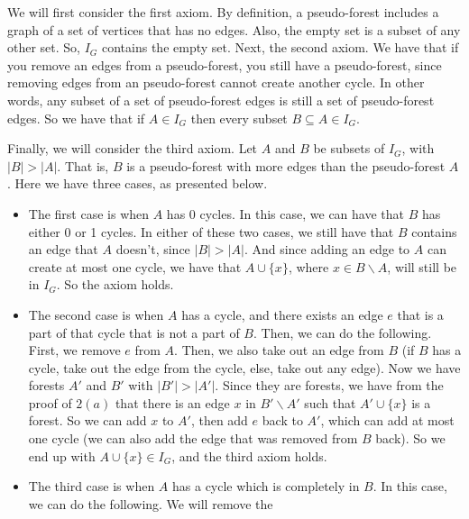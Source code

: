 \documentclass{article}
\begin{document}
\begin{description}
        We will first consider the first axiom. By definition, a pseudo-forest includes
        a graph of a set of vertices that has no edges. Also, the empty set is a
        subset of any other set. So, $I_G$ contains the empty set. Next, the
        second axiom. We have that if you remove an edges from a pseudo-forest,
        you still have a pseudo-forest, since removing edges from an
        pseudo-forest cannot create another cycle. In other words, any subset of
        a set of pseudo-forest edges is still a set of pseudo-forest edges. So
        we have that if $A \in I_G$ then every subset $B \subseteq A \in I_G$.

        Finally, we will consider the third axiom. Let $A$ and $B$ be subsets
        of $I_G$, with $|B| > |A|$. That is, $B$ is a pseudo-forest with more
        edges than the pseudo-forest $A$. Here we have three cases, as
        presented below.
        \begin{itemize}
            \item The first case is when $A$ has 0 cycles. In this case, we can
                have that $B$ has either 0 or 1 cycles. In either of these two
                cases, we still have that $B$ contains an edge that $A$ doesn't,
                since $|B| > |A|$. And since adding an edge to $A$ can create at
                most one cycle, we have that $A \cup \{x\}$, where $x \in B
                \backslash A$, will still be in $I_G$. So the axiom holds.
            \item The second case is when $A$ has a cycle, and there exists an
                edge $e$ that is a part of that cycle that is not a part of $B$.
                Then, we can do the following. First, we remove $e$ from $A$.
                Then, we also take out an edge from $B$ (if $B$ has a cycle,
                take out the edge from the cycle, else, take out any edge).
                Now we have forests $A'$ and $B'$ with
                $|B'| > |A'|$. Since they are forests, we have from the proof of
                $2(a)$ that there is an edge $x$ in $B' \backslash A'$ such that $A'
                \cup \{x\}$ is a forest. So we can add $x$ to $A'$, then add $e$ back to $A'$, which
                can add at most one cycle (we can also add the edge that was
                removed from $B$ back). So we end up with $A \cup \{x\} \in
                I_G$, and the third axiom holds.
            \item The third case is when $A$ has a cycle which is completely in
                $B$. In this case, we can do the following. We will remove the

\end{itemize}
\end{description}
\end{document}
